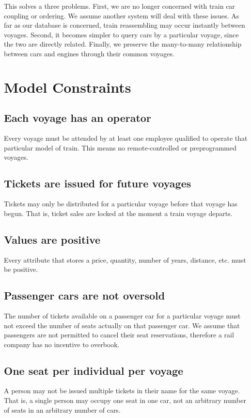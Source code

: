\documentclass[a4paper]{article}
\begin{document}
This solves a three problems. First, we are no longer concerned with train car coupling or ordering. We assume another system will deal with these issues. As far as our database is concerned, train reassembling may occur instantly between voyages. Second, it becomes simpler to query cars by a particular voyage, since the two are directly related. Finally, we preserve the many-to-many relationship between cars and engines through their common voyages.


\section{Model Constraints}
\subsection*{Each voyage has an operator}
Every voyage must be attended by at least one employee qualified to operate that particular model of train. This means no remote-controlled or preprogrammed voyages.

\subsection*{Tickets are issued for future voyages}
Tickets may only be distributed for a particular voyage before that voyage has begun. That is, ticket sales are locked at the moment a train voyage departs.

\subsection*{Values are positive}
Every attribute that stores a price, quantity, number of years, distance, etc. must be positive.

\subsection*{Passenger cars are not oversold}
The number of tickets available on a passenger car for a particular voyage must not exceed the number of seats actually on that passenger car. We assume that passengers are not permitted to cancel their seat reservations, therefore a rail company has no incentive to overbook.

\subsection*{One seat per individual per voyage}
A person may not be issued multiple tickets in their name for the same voyage. That is, a single person may occupy one seat in one car, not an arbitrary number of seats in an arbitrary number of cars. 
\end{document}
